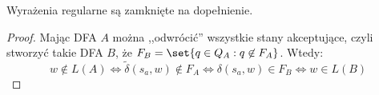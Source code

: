 \begin{theorem}
   Wyrażenia regularne są zamknięte na dopełnienie.
\end{theorem}
\begin{proof}
   Mając DFA \(A\) można ,,odwrócić'' wszystkie stany akceptujące, czyli stworzyć takie DFA \(B\), że \(F_B = \set{q \in Q_A : q \not \in F_A}\). Wtedy:
   \[ 
      w \not\in L(A) \iff \tilde \delta(s_a, w) \not \in F_A \iff \delta(s_a, w) \in F_B \iff w \in L(B)
   \]
\end{proof}